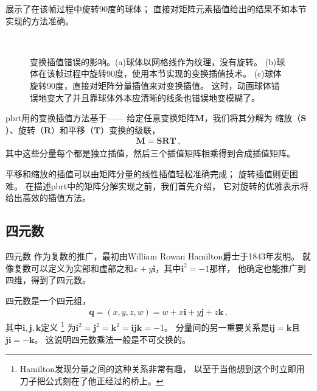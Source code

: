 展示了在该帧过程中旋转90度的球体；
直接对矩阵元素插值给出的结果不如本节实现的方法准确。
\begin{figure}[htb]
    \raggedright
    \\%
    \quad%
    \begin{minipage}{0.45\textwidth}
        \vspace{-\linewidth}\caption{变换插值错误的影响。(a)球体以网格线作为纹理，没有旋转。
            (b)球体在该帧过程中旋转90度，使用本节实现的变换插值技术。
            (c)球体旋转90度，直接对矩阵分量插值来对变换插值。
            这时，动画球体错误地变大了并且靠球体外本应清晰的线条也错误地变模糊了。}
        \label{fig:2.16}
    \end{minipage}
\end{figure}

pbrt用的变换插值方法基于——
给定任意变换矩阵$\bm M$，我们将其分解为
缩放（$\bm S$）、旋转（$\bm R$）和平移（$\bm T$）变换的级联，
\begin{align*}
    \bm M=\bm S\bm R\bm T\, ,
\end{align*}
其中这些分量每个都是独立插值，然后三个插值矩阵相乘得到合成插值矩阵。

平移和缩放的插值可以由矩阵分量的线性插值轻松准确完成；
旋转插值则更困难。
在描述pbrt中的矩阵分解实现之前，我们首先介绍，
它对旋转的优雅表示将给出高效的插值方法。

\subsection{四元数}\label{sub:四元数}
四元数
作为复数的推广，最初由William Rowan Hamilton爵士于1843年发明。
就像复数可以定义为实部和虚部之和$x+y\mathbf{i}$，其中$\mathbf{i}^2=-1$那样，
他确定也能推广到四维，得到了四元数。

四元数是一个四元组，
\begin{align}\label{eq:2.4}
    \bm q=(x,y,z,w)=w+x\mathbf{i}+y\mathbf{j}+z\mathbf{k}\, ,
\end{align}
其中$\mathbf{i}, \mathbf{j}, \mathbf{k}$定义
\footnote{Hamilton发现分量之间的这种关系非常有趣，
    以至于当他想到这个时立即用刀子把公式刻在了他正经过的桥上。}
为$\mathbf{i}^2=\mathbf{j}^2=\mathbf{k}^2=\mathbf{i}\mathbf{j}\mathbf{k}=-1$。
分量间的另一重要关系是$\mathbf{i}\mathbf{j}=\mathbf{k}$且
$\mathbf{j}\mathbf{i}=-\mathbf{k}$。
这说明四元数乘法一般是不可交换的。

